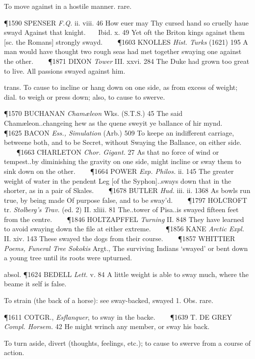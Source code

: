 \begin{description}[wide, labelwidth=!, labelindent=0pt]
\begin{myenumerate}
 To move against in a hostile manner. rare.

\P 1590 SPENSER  \textit{F.Q.} ii. viii. 46 How euer may Thy cursed hand so cruelly haue swayd Against that knight.    Ibid. x. 49 Yet oft the Briton kings against them [sc. the Romans] strongly swayd.    
\P 1603 KNOLLES  \textit{Hist. Turks} (1621) 195 A man would have thought two rough seas had met together swaying one against the other.    
\P 1871 DIXON  \textit{Tower} III. xxvi. 284 The Duke had grown too great to live. All passions swayed against him.

 trans. To cause to incline or hang down on one side, as from excess of weight; dial. to weigh or press down; also, to cause to swerve.

\P 1570 BUCHANAN  \textit{Chamæleon} Wks. (S.T.S.) 45 The said Chamæleon..changeing hew as the quene sweyit ye ballance of hir mynd.    
\P 1625 BACON  \textit{Ess., Simulation} (Arb.) 509 To keepe an indifferent carriage, betweene both, and to be Secret, without Swaying the Ballance, on either side.    
\P 1663 CHARLETON  \textit{Chor. Gigant.} 27 As that no force of wind or tempest..by diminishing the gravity on one side, might incline or sway them to sink down on the other.    
\P 1664 POWER  \textit{Exp. Philos.} ii. 145 The greater weight of water in the pendent Leg [of the Syphon]..sways down that in the shorter, as in a pair of Skales.    
\P 1678 BUTLER  \textit{Hud.} iii. ii. 1368 As bowls  run true, by being made Of purpose false, and to be sway'd.    
\P 1797 HOLCROFT tr.  \textit{Stolberg's Trav.} (ed. 2) II. xliii. 81 The..tower of Pisa..is swayed fifteen feet from the centre.    
\P 1846 HOLTZAPFFEL  \textit{Turning} II. 848 They have learned to avoid swaying down the file at either extreme.    
\P 1856 KANE  \textit{Arctic Expl.} II. xiv. 143 These swayed the dogs from their course.    
\P 1857 WHITTIER  \textit{Poems, Funeral Tree Sokokis} Argt., The surviving Indians ‘swayed’ or bent down a young tree until its roots were upturned.

\noindent absol. \P 1624 BEDELL  \textit{Lett.} v. 84 A little weight is able to sway much, where the beame it self is false.

 To strain (the back of a horse): see sway-backed, swayed 1. Obs. rare.

\P 1611 COTGR.,  \textit{Esflanquer}, to sway in the backe.    
\P 1639 T. DE GREY  \textit{Compl. Horsem.} 42 He might wrinch any member, or sway his back.

 To turn aside, divert (thoughts, feelings, etc.); to cause to swerve from a course of action.


\end{myenumerate}
\end{description}
